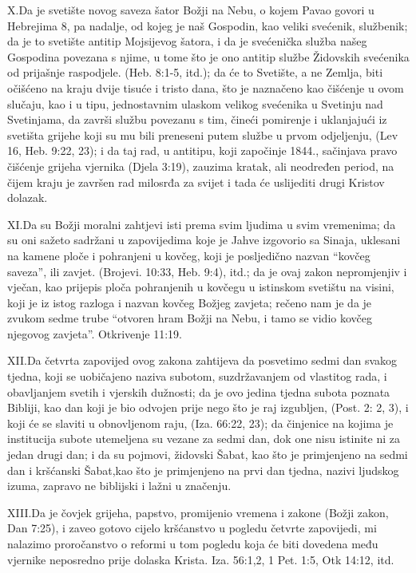 \lettrine{X.} Da je svetište novog saveza šator Božji na Nebu, o kojem Pavao govori u Hebrejima 8, pa nadalje, od kojeg je naš Gospodin, kao veliki svećenik, službenik; da je to svetište antitip Mojsijevog šatora, i da je svećenička služba našeg Gospodina povezana s njime, u tome što je ono antitip službe Židovskih svećenika od prijašnje raspodjele. (Heb. 8:1-5, itd.); da će to Svetište, a ne Zemlja, biti očišćeno na kraju dvije tisuće i tristo dana, što je naznačeno kao čišćenje u ovom slučaju, kao i u tipu, jednostavnim ulaskom velikog svećenika u Svetinju nad Svetinjama, da završi službu povezanu s tim, čineći pomirenje i uklanjajući iz svetišta grijehe koji su mu bili preneseni putem službe u prvom odjeljenju, (Lev 16, Heb. 9:22, 23); i da taj rad, u antitipu, koji započinje 1844., sačinjava pravo čišćenje grijeha vjernika (Djela 3:19), zauzima kratak, ali neodređen period, na čijem kraju je završen rad milosrđa za svijet i tada će uslijediti drugi Kristov dolazak.

\lettrine{XI.} Da su Božji moralni zahtjevi isti prema svim ljudima u svim vremenima; da su oni sažeto sadržani u zapovijedima koje je Jahve izgovorio sa Sinaja, uklesani na kamene ploče i pohranjeni u kovčeg, koji je posljedično nazvan “kovčeg saveza”, ili zavjet. (Brojevi. 10:33, Heb. 9:4), itd.; da je ovaj zakon nepromjenjiv i vječan, kao prijepis ploča pohranjenih u kovčegu u istinskom svetištu na visini, koji je iz istog razloga i nazvan kovčeg Božjeg zavjeta; rečeno nam je da je zvukom sedme trube “otvoren hram Božji na Nebu, i tamo se vidio kovčeg njegovog zavjeta”. Otkrivenje 11:19.

\lettrine{XII.} Da četvrta zapovijed ovog zakona zahtijeva da posvetimo sedmi dan svakog tjedna, koji se uobičajeno naziva subotom, suzdržavanjem od vlastitog rada, i obavljanjem svetih i vjerskih dužnosti; da je ovo jedina tjedna subota poznata Bibliji, kao dan koji je bio odvojen prije nego što je raj izgubljen, (Post. 2: 2, 3), i koji će se slaviti u obnovljenom raju, (Iza. 66:22, 23); da činjenice na kojima je institucija subote utemeljena su vezane za sedmi dan, dok one nisu istinite ni za jedan drugi dan; i da su pojmovi, židovski Šabat, kao što je primjenjeno na sedmi dan i kršćanski Šabat,kao što je primjenjeno na prvi dan tjedna, nazivi ljudskog izuma, zapravo ne biblijski i lažni u značenju.

\lettrine{XIII.} Da je čovjek grijeha, papstvo, promijenio vremena i zakone (Božji zakon, Dan 7:25), i zaveo gotovo cijelo kršćanstvo u pogledu četvrte zapovijedi, mi nalazimo proročanstvo o reformi u tom pogledu koja će biti dovedena među vjernike neposredno prije dolaska Krista. Iza. 56:1,2, 1 Pet. 1:5, Otk 14:12, itd.

